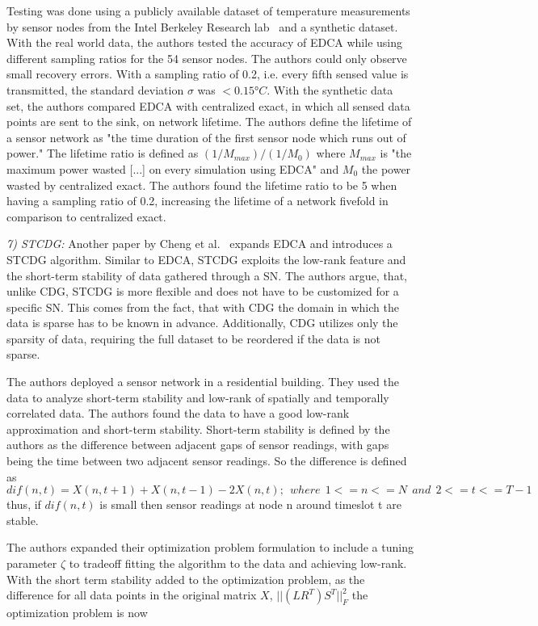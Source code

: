 Testing was done using a publicly available dataset of temperature measurements
by sensor nodes from the Intel Berkeley Research lab~\cite{labdata} and a
synthetic dataset. With the real world data, the authors tested the accuracy of
\ac{EDCA} while using different sampling ratios for the 54 sensor nodes. The
authors could only observe small recovery errors. With a sampling ratio of 0.2,
i.e. every fifth sensed value is transmitted, the standard deviation $ \sigma $
was $ < 0.15°C $. With the synthetic data set, the authors compared \ac{EDCA}
with centralized exact, in which all sensed data points are sent to the sink,
on network lifetime. The authors define the lifetime of a sensor network as
"the time duration of the first sensor node which runs out of power." The
lifetime ratio is defined as $ (1/M_{max}) / (1/M_0) $ where $ M_{max} $ is
"the maximum power wasted [...] on every simulation using \ac{EDCA}" and $ M_0
$ the power wasted by centralized exact. The authors found the lifetime ratio
to be 5 when having a sampling ratio of 0.2, increasing the lifetime of a
network fivefold in comparison to centralized exact. 

\textit{7) \ac{STCDG}:}
Another paper by Cheng et al.~\cite{cheng2013stcdg} expands \ac{EDCA} and
introduces a \ac{STCDG} algorithm. Similar to \ac{EDCA}, \ac{STCDG} exploits
the low-rank feature and the short-term stability of data gathered through a
\ac{SN}. The authors argue, that, unlike \ac{CDG}, \ac{STCDG} is more flexible
and does not have to be customized for a specific \ac{SN}. This comes from the
fact, that with \ac{CDG} the domain in which the data is sparse has to be
known in advance. Additionally, \ac{CDG} utilizes only the sparsity of data,
requiring the full dataset to be reordered if the data is not sparse.

The authors deployed a sensor network in a residential building. They used the
data to analyze short-term stability and low-rank of spatially and temporally
correlated data. The authors found the data to have a good low-rank
approximation and short-term stability. Short-term stability is defined by the
authors as the difference between adjacent gaps of sensor readings, with gaps
being the time between two adjacent sensor readings. So the difference is
defined as
$$
dif(n,t) = X(n,t + 1) + X(n,t - 1) - 2X(n, t); \ \ where  \ \ 1 <= n <= N  \ \ and  \ \ 2 <= t <= T - 1
$$
thus, if $ dif(n, t) $ is small then sensor readings at node n around timeslot
t are stable.

The authors expanded their optimization problem formulation to include a tuning
parameter $ \zeta $ to tradeoff fitting the algorithm to the data and achieving
low-rank. With the short term stability added to the optimization problem, as
the difference for all data points in the original matrix $ X $, $
||(LR^T)S^T||^2_F $ the optimization problem is now

